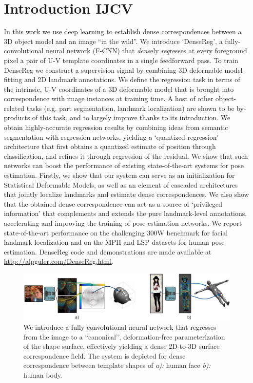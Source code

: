 \section{Introduction IJCV}
In this work we use deep learning to establish dense correspondences between a 3D object model and an image  ``in the wild''. We introduce `DenseReg', 
 a  fully-convolutional neural network (F-CNN) that  {\em{dens}}ely {\em{reg}}resses  at every foreground pixel a pair of U-V template coordinates in a single feedforward pass. 
To train DenseReg we construct a supervision signal by combining 3D deformable model fitting and 2D landmark annotations. We define the regression task in terms of the intrinsic, U-V coordinates of a 3D deformable model that is brought into correspondence with image instances at training time. A host of other object-related tasks (e.g. part segmentation, landmark localization) are shown to be by-products of this task, and to largely improve thanks to its introduction. 
We obtain highly-accurate regression results by combining ideas from semantic segmentation with regression networks, yielding a `quantized regression' architecture that first obtains a quantized estimate of position through classification, and refines it through regression of the residual.
We show that such networks can boost the performance of existing state-of-the-art systems for pose estimation. 
Firstly, we show that 
our system can serve as an initialization for Statistical Deformable Models, as well as an element of cascaded architectures that jointly localize landmarks and estimate dense correspondences. We also show that  the obtained dense correspondence can act as  a  source  of  ‘privileged  information’  that  complements and extends the pure landmark-level annotations, accelerating and improving the training of pose estimation networks.
We report state-of-the-art performance  on the challenging 300W benchmark for facial landmark localization and on the MPII and LSP datasets for human pose estimation.
DenseReg code and demonstrations are made available at \url{http://alpguler.com/DenseReg.html}.




\begin{figure}[ht]
    \begin{center}
       \includegraphics[width=1\linewidth]{resources/Human_Poses/denseregPami2}
    \end{center}
       \caption{ We introduce a fully convolutional neural network that regresses from the image to a ``canonical'', deformation-free parameterization of the shape surface, effectively yielding a dense 2D-to-3D surface correspondence field. The system is depicted for dense correspondence between template shapes of \textit{a):} human face \textit{b):} human body.}
    \label{fig:intro_human_pose}
\end{figure}
    

